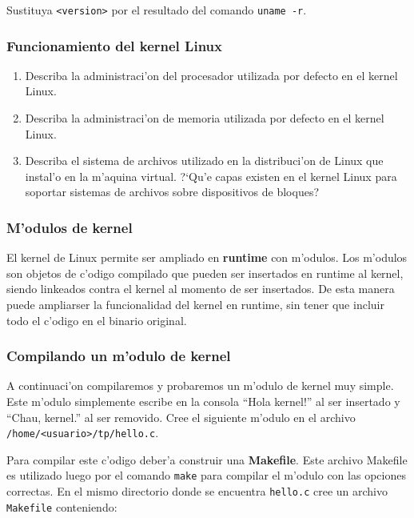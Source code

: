 Sustituya \texttt{<version>} por el resultado del comando \texttt{uname -r}.

\subsubsection{Funcionamiento del kernel Linux}

\begin{enumerate}

\item Describa la administraci'on del procesador utilizada por defecto en el kernel Linux.

\item Describa la administraci'on de memoria utilizada por defecto en el kernel Linux.

\item Describa el sistema de archivos utilizado en la distribuci'on de Linux que instal'o en la m'aquina virtual.
?`Qu'e capas existen en el kernel Linux para soportar sistemas de archivos sobre dispositivos de bloques?

\end{enumerate}

\subsubsection{M'odulos de kernel}

El kernel de Linux permite ser ampliado en \textbf{runtime} con m'odulos. Los m'odulos son objetos de c'odigo compilado
que pueden ser insertados en runtime al kernel, siendo linkeados contra el kernel al momento de ser insertados. De esta
manera puede ampliarser la funcionalidad del kernel en runtime, sin tener que incluir todo el c'odigo en el binario
original.

\subsubsection{Compilando un m'odulo de kernel}

A continuaci'on compilaremos y probaremos un m'odulo de kernel muy simple. Este m'odulo simplemente escribe en la consola
``Hola kernel!'' al ser insertado y ``Chau, kernel.'' al ser removido. Cree el siguiente m'odulo en el archivo
\texttt{/home/<usuario>/tp/hello.c}.


Para compilar este c'odigo deber'a construir una \textbf{Makefile}. Este archivo Makefile es utilizado luego por el
comando \texttt{make} para compilar el m'odulo con las opciones correctas. En el mismo directorio donde se encuentra
\texttt{hello.c} cree un archivo \texttt{Makefile} conteniendo:

